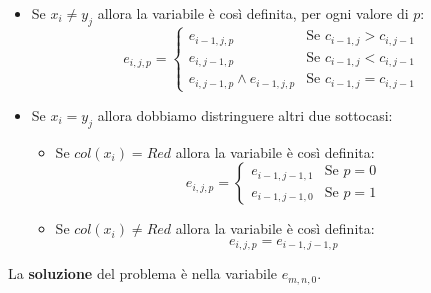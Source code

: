 \documentclass[12pt]{article}
\begin{document}
\begin{itemize}
    \item Se $x_i \neq y_j$ allora la variabile è così definita, per ogni valore di $p$:
    \begin{equation*}
        e_{i,j,p} = \begin{cases}
            e_{i-1, j, p} & \textrm{Se } c_{i-1, j} > c_{i, j-1} \\
            e_{i, j-1, p} & \textrm{Se } c_{i-1, j} < c_{i, j-1} \\
            e_{i, j-1 , p} \land e_{i-1, j, p} & \textrm{Se } c_{i-1, j} = c_{i, j-1}
        \end{cases}
    \end{equation*}
    \item Se $x_i = y_j$ allora dobbiamo distringuere altri due sottocasi:
    \begin{itemize}
        \item Se $col(x_i) = Red$ allora la variabile è così definita:
        \begin{equation*}
            e_{i,j,p} = \begin{cases}
                e_{i-1, j-1, 1} & \textrm{Se } p = 0 \\
                e_{i-1, j-1, 0} & \textrm{Se } p = 1
            \end{cases}
        \end{equation*}
        \item Se $col(x_i) \neq Red$ allora la variabile è così definita:
        $$e_{i,j,p} = e_{i-1, j-1, p}$$
    \end{itemize}
\end{itemize}
La \textbf{soluzione} del problema è nella variabile $e_{m,n,0}$.
\end{document}
